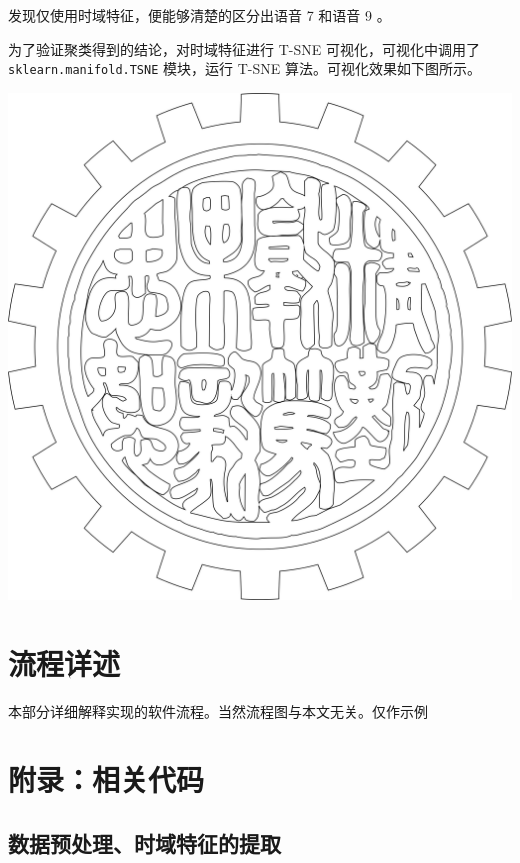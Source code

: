 发现仅使用时域特征，便能够清楚的区分出语音 7 和语音 9 。

为了验证聚类得到的结论，对时域特征进行 T-SNE 可视化，可视化中调用了
\texttt{sklearn.manifold.TSNE} 模块，运行 T-SNE
算法。可视化效果如下图所示。

\includegraphics{./cover.png}

\section{流程详述}

本部分详细解释实现的软件流程。当然流程图与本文无关。仅作示例



\section{附录：相关代码}


\subsection{数据预处理、时域特征的提取}

